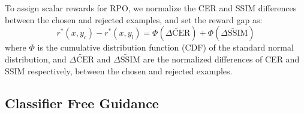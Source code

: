 To assign scalar rewards for RPO, we normalize the CER and SSIM differences between the chosen and rejected examples, and set the reward gap as: 
$$r^*(x,y_c) - r^*(x,y_l) = \Phi (\tilde{\Delta \text{CER}}) + \Phi (\tilde{\Delta \text{SSIM}})$$
where $\Phi$ is the cumulative distribution function (CDF) of the standard normal distribution, and $\tilde{\Delta \text{CER}}$ and $\tilde{\Delta \text{SSIM}}$ are the normalized differences of CER and SSIM respectively, between the chosen and rejected examples.





\subsection{Classifier Free Guidance}\label{sec:cfg}
